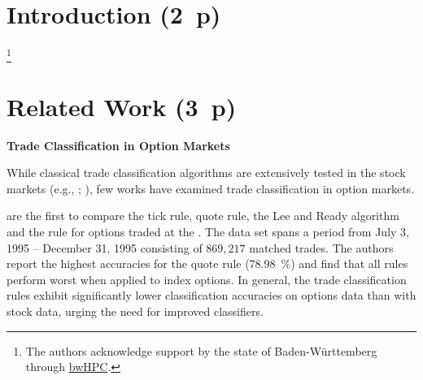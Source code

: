 \section{Introduction (2~p)}\label{sec:introduction}

\footnote{The authors acknowledge support by the state of Baden-Württemberg through \href{https://www.bwhpc.de/}{bwHPC}.}
\newpage

\section{Related Work (3~p)}\label{sec:related-work}

\textbf{Trade Classification in Option Markets}

While classical trade classification algorithms are extensively tested in the stock markets (e.g., \textcite{chakrabartyTradeClassificationAlgorithms2012}; \textcite{odders-whiteOccurrenceConsequencesInaccurate2000}), few works have examined trade classification in option markets.

\textcite[882--883]{savickasInferringDirectionOption2003} are the first to compare the tick rule, quote rule, the Lee and Ready algorithm and the  rule for options traded at the . The data set spans a period from July 3, 1995 -- December 31, 1995 consisting of $869{,}217$ matched trades. The authors report the highest accuracies for the quote rule (\SI{78.98}{\percent}) and find that all rules perform worst when applied to index options. In general, the trade classification rules exhibit significantly lower classification accuracies on options data than with stock data, urging the need for improved classifiers.

